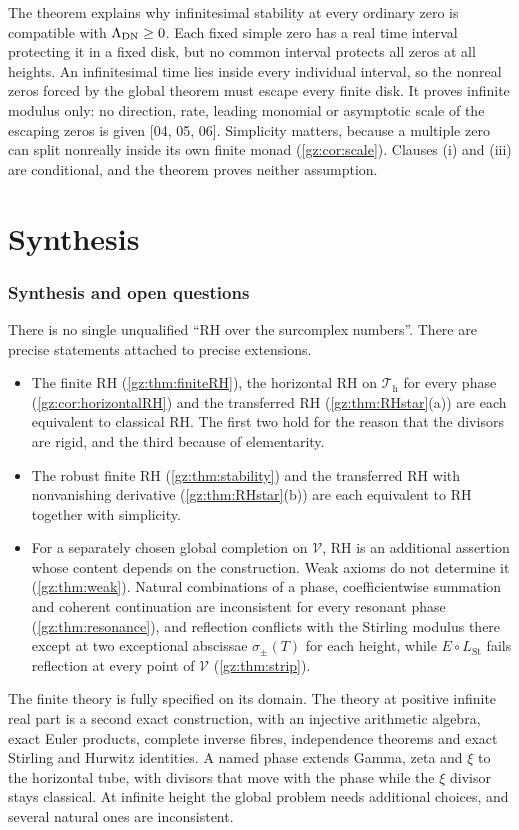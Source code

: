 \documentclass[11pt,a4paper]{article}
\numberwithin{equation}{section}
\theoremstyle{definition}
\theoremstyle{remark}
\newcommand{\LSt}{L_{\mathrm{St}}}
\newcommand{\Th}{\mathcal T_{\mathrm h}}
\newcommand{\Vs}{\mathcal V}
\newcommand{\src}[1]{\textup{[#1]}}
\begin{document}
The theorem explains why infinitesimal stability at every ordinary zero is
compatible with $\Lambda_{\rm DN}\ge0$. Each fixed simple zero has a real time
interval protecting it in a fixed disk, but no common interval protects all
zeros at all heights. An infinitesimal time lies inside every individual
interval, so the nonreal zeros forced by the global theorem must escape every
finite disk. It proves infinite modulus only: no direction, rate, leading
monomial or asymptotic scale of the escaping zeros is given \src{04, 05, 06}.
Simplicity matters, because a multiple zero can split nonreally inside its own
finite monad (\cref{gz:cor:scale}). Clauses (i) and (iii) are conditional,
and the theorem proves neither assumption.

\part{Synthesis}\label{gz:part:synthesis}

\section{Synthesis and open questions}\label{gz:sec:synthesis}

There is no single unqualified ``RH over the surcomplex numbers''. There are
precise statements attached to precise extensions.
\begin{itemize}
\item The finite RH (\cref{gz:thm:finiteRH}), the horizontal RH on $\Th$ for
 every phase (\cref{gz:cor:horizontalRH}) and the transferred RH
 (\cref{gz:thm:RHstar}(a)) are each equivalent to classical RH. The first two
 hold for the reason that the divisors are rigid, and the third because of
 elementarity.
\item The robust finite RH (\cref{gz:thm:stability}) and the transferred RH
 with nonvanishing derivative (\cref{gz:thm:RHstar}(b)) are each equivalent
 to RH together with simplicity.
\item For a separately chosen global completion on $\Vs$, RH is an additional
 assertion whose content depends on the construction. Weak axioms do not
 determine it (\cref{gz:thm:weak}). Natural combinations of a phase,
 coefficientwise summation and coherent continuation are inconsistent for
 every resonant phase (\cref{gz:thm:resonance}), and reflection conflicts
 with the Stirling modulus there except at two exceptional abscissae
 $\sigma_\pm(T)$ for each height, while $E\circ\LSt$ fails reflection at
 every point of $\Vs$ (\cref{gz:thm:strip}).
\end{itemize}
The finite theory is fully specified on its domain. The theory at positive
infinite real part is a second exact construction, with an injective
arithmetic algebra, exact Euler products, complete inverse fibres,
independence theorems and exact Stirling and Hurwitz identities. A named phase
extends Gamma, zeta and $\xi$ to the horizontal tube, with divisors that move
with the phase while the $\xi$ divisor stays classical. At infinite height
the global problem needs additional choices, and several natural ones are
inconsistent.
\end{document}
